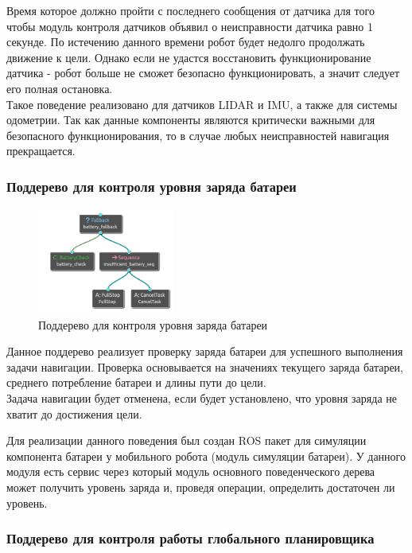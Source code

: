 Время которое должно пройти с последнего сообщения от датчика для того чтобы модуль контроля датчиков объявил о неисправности датчика равно 1 секунде. По истечению данного времени робот будет недолго продолжать движение к цели. Однако если не удастся восстановить функционирование датчика - робот больше не сможет безопасно функционировать, а значит следует его полная остановка. \\
Такое поведение реализовано для датчиков LIDAR и IMU, а также для системы одометрии. Так как данные компоненты являются критически важными для безопасного функционирования, то в случае любых неисправностей навигация прекращается.

\subsubsection{Поддерево для контроля уровня заряда батареи}

\begin{figure}[h]
    \centering
    \includegraphics[width=0.4\textwidth]{images/chap_3/battery_subtree.png}
    \caption{Поддерево для контроля уровня заряда батареи}
    \label{fig:battery_subtree}
\end{figure}

Данное поддерево реализует проверку заряда батареи для успешного выполнения задачи навигации. Проверка основывается на значениях текущего заряда батареи, среднего потребление батареи и длины пути до цели. \\
Задача навигации будет отменена, если будет установлено, что уровня заряда не хватит до достижения цели.

Для реализации данного поведения был создан ROS пакет для симуляции компонента батареи у мобильного робота (модуль симуляции батареи). У данного модуля есть сервис через который модуль основного поведенческого дерева может получить уровень заряда и, проведя операции, определить достаточен ли уровень.

\subsubsection{Поддерево для контроля работы глобального планировщика}

